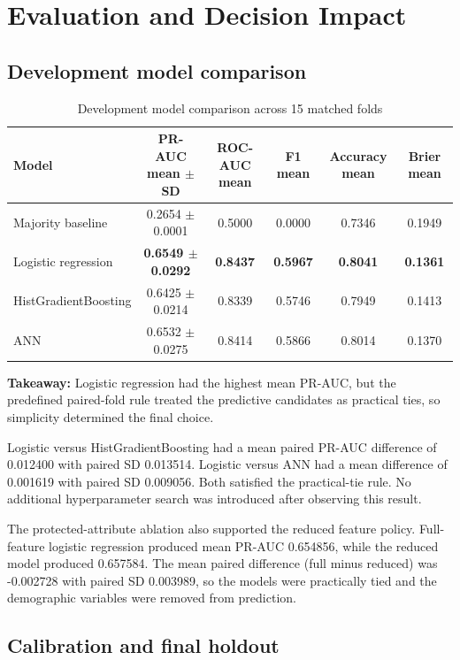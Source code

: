 \documentclass[11pt]{article}
\newcommand{\takeaway}[1]{\vspace{1pt}\noindent\textbf{Takeaway:} #1\vspace{3pt}}
\begin{document}
\section{Evaluation and Decision Impact}

\subsection{Development model comparison}

\begin{table}[H]
\centering\scriptsize
\caption{Development model comparison across 15 matched folds}
\begin{tabular}{lccccc}
\toprule
Model & PR-AUC mean $\pm$ SD & ROC-AUC mean & F1 mean & Accuracy mean & Brier mean \\
\midrule
Majority baseline & 0.2654 $\pm$ 0.0001 & 0.5000 & 0.0000 & 0.7346 & 0.1949 \\
Logistic regression & \textbf{0.6549 $\pm$ 0.0292} & \textbf{0.8437} & \textbf{0.5967} & \textbf{0.8041} & \textbf{0.1361} \\
HistGradientBoosting & 0.6425 $\pm$ 0.0214 & 0.8339 & 0.5746 & 0.7949 & 0.1413 \\
ANN & 0.6532 $\pm$ 0.0275 & 0.8414 & 0.5866 & 0.8014 & 0.1370 \\
\bottomrule
\end{tabular}
\end{table}
\takeaway{Logistic regression had the highest mean PR-AUC, but the predefined paired-fold rule treated the predictive candidates as practical ties, so simplicity determined the final choice.}

Logistic versus HistGradientBoosting had a mean paired PR-AUC difference of 0.012400 with paired SD 0.013514. Logistic versus ANN had a mean difference of 0.001619 with paired SD 0.009056. Both satisfied the practical-tie rule. No additional hyperparameter search was introduced after observing this result.

The protected-attribute ablation also supported the reduced feature policy. Full-feature logistic regression produced mean PR-AUC 0.654856, while the reduced model produced 0.657584. The mean paired difference (full minus reduced) was -0.002728 with paired SD 0.003989, so the models were practically tied and the demographic variables were removed from prediction.

\subsection{Calibration and final holdout}
\end{document}
